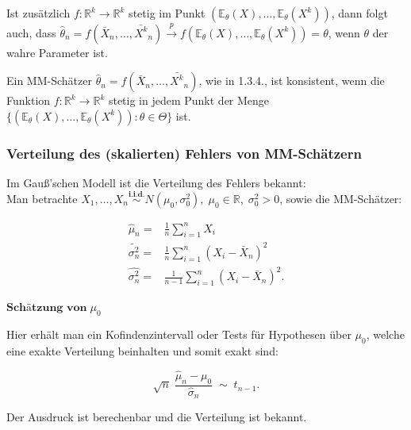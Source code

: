 \documentclass[10pt]{article}
\newcommand{\FZV}{X_1, \ldots, X_n} %
\newcommand{\IR}{\mathbb{R}} %
\newcommand{\EW}{\mathbb{E}} %
\begin{document}
\begin{enumerate}
	Ist zusätzlich $f: \IR^k \rightarrow \IR^k$ stetig im Punkt $(\EW_\theta(X),\ldots,\EW_\theta(X^k))$, dann folgt auch, dass $\hat{\theta}_n = f(\bar{X}_n, \ldots, \bar{X^k}_n) \overset{p} \rightarrow f(\EW_\theta(X),\ldots,\EW_\theta(X^k)) = \theta$, wenn $\theta$ der wahre Parameter ist. 

	\begin{Definition}
	Ein MM-Schätzer $\hat\theta_n = f(\bar{X}_n,\ldots,\bar{X^k}_n)$, wie in 1.3.4., ist konsistent, wenn die Funktion $f:\IR ^k \rightarrow \IR ^k$ stetig in jedem Punkt der Menge $\{(\EW_\theta(X),\ldots, \EW_\theta(X^k)) : \theta \in \Theta\}$ ist.	\end{Definition}

\end{enumerate}

\subsubsection{Verteilung des (skalierten) Fehlers von MM-Schätzern}

	Im Gauß'schen Modell ist die Verteilung des Fehlers bekannt: \\
	Man  betrachte $\FZV \overset{\textbf{i.i.d.}} {\sim} N(\mu_0,\sigma_0^2),\; \mu_0 \in \IR, \; \sigma_0^2 >0$, sowie die MM-Schätzer:
	
	\begin{equation*}
	\begin{split}
		\hat{\mu}_n =& \frac{1}{n}\sum_{i=1}^{n} X_i\\
		\tilde{\sigma^2_n} =&\frac{1}{n}\sum_{i=1}^{n} (X_i - \bar{X}_n)^2\\
		\hat{\sigma^2_n}=&\frac{1}{n-1}\sum_{i=1}^{n} (X_i - \bar{X}_n)^2.
	\end{split}
	\end{equation*}
	
		\noindent $\textbf{Schätzung von} \; \mu_0$
	
		\noindent Hier  erhält man ein Kofindenzintervall oder Tests für Hypothesen über $\mu_0$, welche eine exakte Verteilung beinhalten und somit exakt sind:
	
	\begin{equation*}
		\sqrt{n} \; \frac{\hat{\mu}_n - \mu_0}{\hat{\sigma}_n} \;{\sim}\; t_{n-1}.
	\end{equation*}
	
		\noindent Der Ausdruck ist berechenbar und die Verteilung ist bekannt.\\
\end{document}
